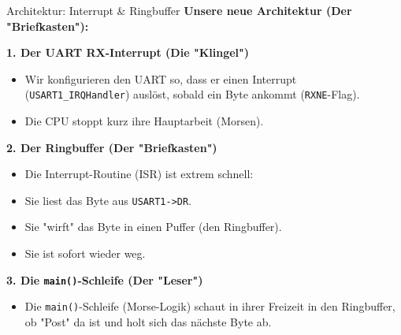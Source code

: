 \documentclass{beamer}
\begin{document}
\begin{frame}{Architektur: Interrupt \& Ringbuffer}
	\textbf{Unsere neue Architektur (Der "Briefkasten"):}
	
	\medskip
	\textbf{1. Der UART RX-Interrupt (Die "Klingel")}
	\begin{itemize}
		\item Wir konfigurieren den UART so, dass er einen Interrupt (\texttt{USART1\_IRQHandler}) auslöst, sobald ein Byte ankommt (\texttt{RXNE}-Flag).
		\item Die CPU stoppt kurz ihre Hauptarbeit (Morsen).
	\end{itemize}
	
	\medskip
	\textbf{2. Der Ringbuffer (Der "Briefkasten")}
	\begin{itemize}
		\item Die Interrupt-Routine (ISR) ist extrem schnell:
		\item Sie liest das Byte aus \texttt{USART1->DR}.
		\item Sie "wirft" das Byte in einen Puffer (den Ringbuffer).
		\item Sie ist sofort wieder weg.
	\end{itemize}
	
	\medskip
	\textbf{3. Die \texttt{main()}-Schleife (Der "Leser")}
	\begin{itemize}
		\item Die \texttt{main()}-Schleife (Morse-Logik) schaut in ihrer Freizeit in den Ringbuffer, ob "Post" da ist und holt sich das nächste Byte ab.
	\end{itemize}
\end{frame}
\end{document}
